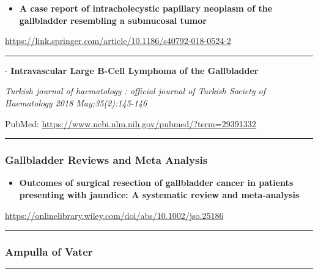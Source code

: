 \documentclass[]{article}
\providecommand{\tightlist}{%
  \setlength{\itemsep}{0pt}\setlength{\parskip}{0pt}}
\begin{document}
\begin{itemize}
\tightlist
\item
  \textbf{A case report of intracholecystic papillary neoplasm of the
  gallbladder resembling a submucosal tumor}
\end{itemize}

\url{https://link.springer.com/article/10.1186/s40792-018-0524-2}

\begin{center}\rule{0.5\linewidth}{\linethickness}\end{center}

 - \textbf{Intravascular Large B-Cell Lymphoma of the Gallbladder}

\emph{Turkish journal of haematology : official journal of Turkish
Society of Haematology 2018 May;35(2):145-146}

PubMed: \url{https://www.ncbi.nlm.nih.gov/pubmed/?term=29391332}

{}

{}

\begin{center}\rule{0.5\linewidth}{\linethickness}\end{center}

\hypertarget{gallbladder-reviews-and-meta-analysis}{%
\subsubsection{Gallbladder Reviews and Meta
Analysis}\label{gallbladder-reviews-and-meta-analysis}}

\begin{itemize}
\tightlist
\item
  \textbf{Outcomes of surgical resection of gallbladder cancer in
  patients presenting with jaundice: A systematic review and
  meta‐analysis}
\end{itemize}

\url{https://onlinelibrary.wiley.com/doi/abs/10.1002/jso.25186}

\begin{center}\rule{0.5\linewidth}{\linethickness}\end{center}

\hypertarget{ampulla-of-vater-1}{%
\subsubsection{Ampulla of Vater}\label{ampulla-of-vater-1}}

\begin{center}\rule{0.5\linewidth}{\linethickness}\end{center}
\end{document}

